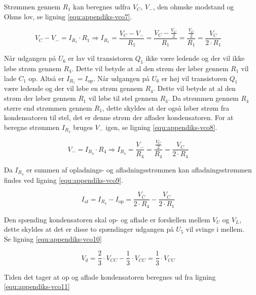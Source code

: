 Strømmen gennem $R_1$ kan beregnes udfra $V_C$, $V_-$, den ohmske modstand og Ohms lov, se ligning \ref{equ:appendiks-vco7}.

\begin{equation}
\label{equ:appendiks-vco7}
V_C - V_- = I_{R_1} \cdot R_1 \Rightarrow I_{R_1} = \frac{V_C - V_-}{R_1} = \frac{V_C - \frac{V_C}{2}}{R_1} = \frac{\frac{V_C}{2}}{R_1} = \frac{V_C}{2 \cdot R_1}
\end{equation}

Når udgangen på $U_6$ er lav vil transistoren $Q_1$ ikke være ledende og der vil ikke løbe strøm gennem $R_4$. Dette vil betyde at al den strøm der løber gennem $R_1$ vil lade $C_1$ op. Altså er $I_{R_1} = I_{\mathrm{op}}$. Når udgangen på $U_6$ er høj vil transistoren $Q_1$ være ledende og der vil løbe en strøm gennem $R_4$. Dette vil betyde at al den strøm der løber gennem $R_1$ vil løbe til stel gennem $R_4$. Da strømmen gennem $R_4$ større end strømmen gennem $R_1$, dette skyldes at der også løber strøm fra kondensatoren til stel, det er denne strøm der aflader kondensatoren. For at beregne strømmen $I_{R_4}$ bruges $V_-$ igen, se ligning \ref{equ:appendiks-vco8}.

\begin{equation}
\label{equ:appendiks-vco8}
V_- = I_{R_4} \cdot R_4 \Rightarrow I_{R_4} = \frac{V_-}{R_4} = \frac{\frac{V_C}{2}}{R_4} = \frac{V_C}{2 \cdot R_4}
\end{equation}

Da $I_{R_4}$ er summen af opladnings- og afladningsstrømmen kan afladningsstrømmen findes ved ligning \ref{equ:appendiks-vco9}.

\begin{equation}
\label{equ:appendiks-vco9}
I_{\mathrm{af}} = I_{R_4} - I_{\mathrm{op}} = \frac{V_C}{2 \cdot R_4} - \frac{V_C}{2 \cdot R_1}
\end{equation}

Den spænding kondensatoren skal op- og aflade er forskellen mellem $V_U$ og $V_L$, dette skyldes at det er disse to spændinger udgangen på $U_5$ vil svinge i mellem. Se ligning \ref{equ:appendiks-vco10}

\begin{equation}
\label{equ:appendiks-vco10}
V_d = \frac{2}{3} \cdot V_{CC} - \frac{1}{3} \cdot V_{CC} = \frac{1}{3} \cdot V_{CC}
\end{equation}

Tiden det tager at op og aflade kondensatoren beregnes ud fra ligning \ref{equ:appendiks-vco11}


